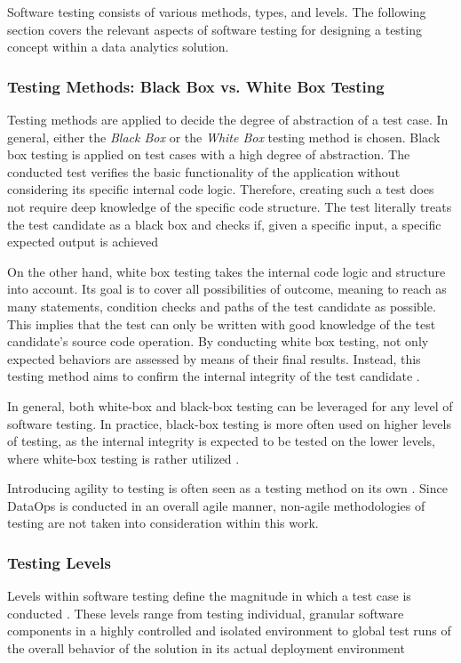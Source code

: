 Software testing consists of various methods, types, and levels. The following section covers the relevant aspects of software testing for designing a testing concept within a data analytics solution.

\subsubsection{Testing Methods: Black Box vs. White Box Testing}
Testing methods are applied to decide the degree of abstraction of a test case. In general, either the \textit{Black Box} or the \textit{White Box} testing method is chosen. Black box testing is applied on test cases with a high degree of abstraction. The conducted test verifies the basic functionality of the application without considering its specific internal code logic. Therefore, creating such a test does not require deep knowledge of the specific code structure. The test literally treats the test candidate as a black box and checks if, given a specific input, a specific expected output is achieved \cite[65]{Mahfuz2016}

On the other hand, white box testing takes the internal code logic and structure into account. Its goal is to cover all possibilities of outcome, meaning to reach as many statements, condition checks and paths of the test candidate as possible. This implies that the test can only be written with good knowledge of the test candidate's source code operation. By conducting white box testing, not only expected behaviors are assessed by means of their final results. Instead, this testing method aims to confirm the internal integrity of the test candidate \cite[65]{Mahfuz2016}.

In general, both white-box and black-box testing can be leveraged for any level of software testing. In practice, black-box testing is more often used on higher levels of testing, as the internal integrity is expected to be tested on the lower levels, where white-box testing is rather utilized \cite[26]{Ammann2017}.

Introducing agility to testing is often seen as a testing method on its own \cite[70]{Mahfuz2016}. Since DataOps is conducted in an overall agile manner, non-agile methodologies of testing are not taken into consideration within this work.

\subsubsection{Testing Levels} \label{sec:2-2-2-levels}
Levels within software testing define the magnitude in which a test case is conducted \cite{Osherove2013}. These levels range from testing individual, granular software components in a highly controlled and isolated environment to global test runs of the overall behavior of the solution in its actual deployment environment \cite{Mahfuz2016}

